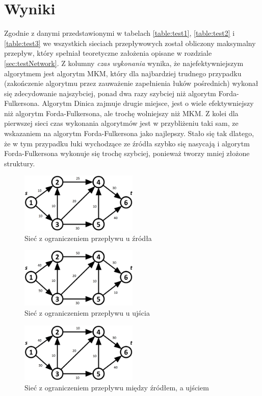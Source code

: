\section{Wyniki}
Zgodnie z danymi przedstawionymi w tabelach \ref{table:test1}, \ref{table:test2} i \ref{table:test3} we wszystkich sieciach przepływowych został obliczony maksymalny przepływ, który spełniał teoretyczne założenia opisane w rozdziale \ref{sec:testNetwork}. Z kolumny \textit{czas wykonania} wynika, że najefektywniejszym algorytmem jest algorytm MKM, który dla najbardziej trudnego przypadku (zakończenie algorytmu przez zauważenie zapełnienia łuków pośrednich) wykonał się zdecydowanie najszybciej, ponad dwa razy szybciej niż algorytm Forda-Fulkersona. Algorytm Dinica zajmuje drugie miejsce, jest o wiele efektywniejszy niż algorytm Forda-Fulkersona, ale trochę wolniejszy niż MKM. Z kolei dla pierwszej sieci czas wykonania algorytmów jest w przybliżeniu taki sam, ze wskazaniem na algorytm Forda-Fulkersona jako najlepszy. Stało się tak dlatego, że w tym przypadku łuki wychodzące ze źródła szybko się nasycają i algorytm Forda-Fulkersona wykonuje się trochę szybciej, ponieważ tworzy mniej złożone struktury.
\begin{figure}
	\centering
	\includegraphics[width=0.5\textwidth]{./img/test1}
	\caption{Sieć z ograniczeniem przepływu u źródła}
	\label{fig:test1}
\end{figure}
\begin{figure}
	\centering
	\includegraphics[width=0.5\textwidth]{./img/test2}
	\caption{Sieć z ograniczeniem przepływu u ujścia}
	\label{fig:test2}
\end{figure}
\begin{figure}
	\centering
	\includegraphics[width=0.5\textwidth]{./img/test3}
	\caption{Sieć z ograniczeniem przepływu między źródłem, a ujściem}
	\label{fig:test3}
\end{figure}
